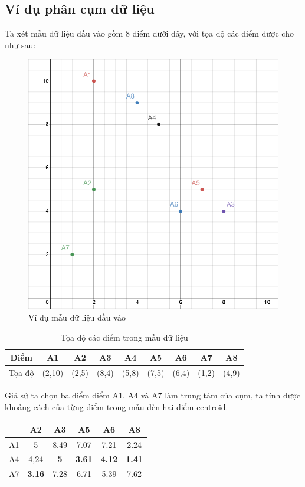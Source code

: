 \documentclass{article}
\begin{document}
	\subsection{Ví dụ phân cụm dữ liệu}
	Ta xét mẫu dữ liệu đầu vào gồm 8 điểm dưới đây, với tọa độ các điểm được cho như sau:
		\begin{figure}[h]
			\centering
			\includegraphics[width=0.7\linewidth]{img/ex_1}
			\caption{Ví dụ mẫu dữ liệu đầu vào}
		\end{figure}\par
	\begin{table}[h]
		\centering
		\begin{tabular}{|c|c|c|c|c|c|c|c|c|}
			\hline
			Điểm & A1 & A2 & A3 & A4 & A5 & A6 & A7 & A8 \\
			\hline
			Tọa độ & (2,10) & (2,5) & (8,4) & (5,8) & (7,5) & (6,4) & (1,2) & (4,9) \\
			\hline
		\end{tabular}\par
		\caption{Tọa độ các điểm trong mẫu dữ liệu}
	\end{table}
	Giả sử ta chọn ba điểm điểm A1, A4 và A7 làm trung tâm của cụm, ta tính được khoảng cách của từng điểm trong mẫu đến hai điểm centroid.\par
	\begin{table}[h]
		\centering
		\begin{tabular}{|c|c|c|c|c|c|}
			\hline
			& A2 & A3 & A5 & A6 & A8 \\
			\hline
			A1 & 5 & 8.49 & 7.07 & 7.21 & 2.24 \\
			\hline
			A4 & 4,24 & \textbf{5} & \textbf{3.61} & \textbf{4.12} & \textbf{1.41} \\
			\hline
			A7 & \textbf{3.16} & 7.28 & 6.71 & 5.39 & 7.62 \\
			\hline
		\end{tabular}
	\end{table}
\end{document}
